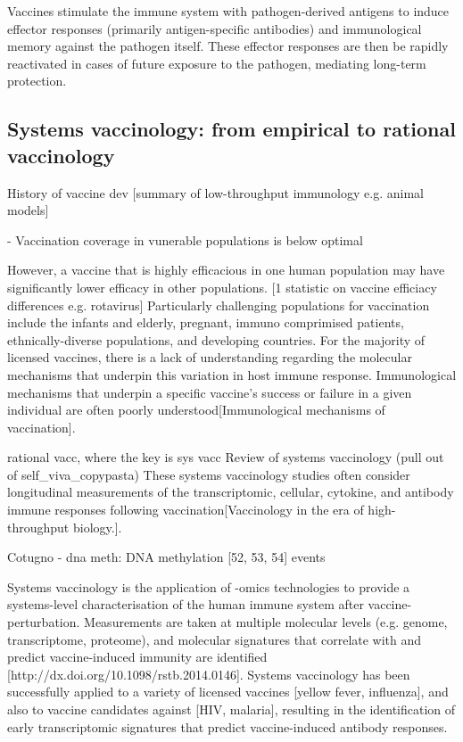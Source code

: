 Vaccines stimulate the immune system with pathogen-derived antigens to induce effector responses (primarily antigen-specific antibodies) and immunological memory against the pathogen itself.
These effector responses are then be rapidly reactivated in cases of future exposure to the pathogen, mediating long-term protection.

\subsection{Systems vaccinology: from empirical to rational vaccinology}

History of vaccine dev
[summary of low-throughput immunology e.g. animal models]  

- Vaccination coverage in vunerable populations is below optimal

However, a vaccine that is highly efficacious in one human population may have significantly lower efficacy in other populations.
[1 statistic on vaccine efficiacy differences e.g. rotavirus]
Particularly challenging populations for vaccination include the infants and elderly, pregnant, immuno comprimised patients, ethnically-diverse populations, and developing countries.
For the majority of licensed vaccines, there is a lack of understanding regarding the molecular mechanisms that underpin this variation in host immune response.
Immunological mechanisms that underpin a specific vaccine's success or failure in a given individual are often poorly understood[Immunological mechanisms of vaccination]. 

rational vacc, where the key is sys vacc
Review of systems vaccinology (pull out of self\_viva\_copypasta)
These systems vaccinology studies often consider longitudinal measurements of the transcriptomic, cellular, cytokine, and antibody immune responses following vaccination[Vaccinology in the era of high-throughput biology.].

Cotugno
- dna meth: DNA methylation [52, 53, 54] events

Systems vaccinology is the application of -omics technologies to provide a systems-level characterisation of the human immune system after vaccine-perturbation.
Measurements are taken at multiple molecular levels (e.g. genome, transcriptome, proteome), and molecular signatures that correlate with and predict vaccine-induced immunity are identified [http://dx.doi.org/10.1098/rstb.2014.0146].
Systems vaccinology has been successfully applied to a variety of licensed vaccines [yellow fever, influenza], and also to vaccine candidates against [HIV, malaria], resulting in the identification of early transcriptomic signatures that predict vaccine-induced antibody responses.

